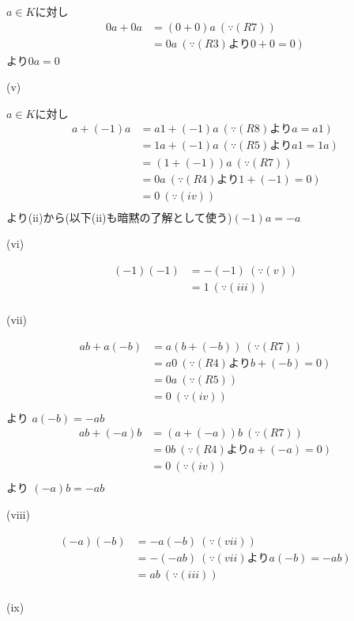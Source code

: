 \documentclass{jsarticle}
\begin{document}
$a\in K$に対し
\begin{align*}
0a+0a &=(0+0)a \ (\because (R7)) \\
&= 0a \ (\because (R3)より0+0=0)
\end{align*}
より$0a=0$

(v)

$a\in K$に対し
\begin{align*}
a+(-1)a &= a1+(-1)a \ (\because (R8)よりa=a1)\\
&= 1a+(-1)a \ (\because (R5)よりa1=1a)\\
&= (1+(-1))a \ (\because (R7))\\
&= 0a \ (\because (R4)より1+(-1)=0)\\
&= 0 \ (\because (iv))\\
\end{align*}
より(ii)から(以下(ii)も暗黙の了解として使う)$(-1)a=-a$


(vi)

\begin{align*}
(-1)(-1) &= -(-1) \ (\because (v))\\
&= 1 \ (\because (iii))\\
\end{align*}

(vii)

\begin{align*}
ab+a(-b) &= a(b+(-b)) \ (\because (R7))\\
&= a0 \ (\because (R4)よりb+(-b)=0)\\
&= 0a \ (\because (R5))\\
&= 0 \ (\because (iv))\\
\end{align*}
より
$a(-b) = -ab$
\begin{align*}
ab+(-a)b &= (a+(-a))b \ (\because (R7))\\
&= 0b \ (\because (R4)よりa+(-a)=0)\\
&= 0 \ (\because (iv))\\
\end{align*}
より
$(-a)b = -ab$

(viii)

\begin{align*}
(-a)(-b) &= -a(-b) \ (\because (vii))\\
&= -(-ab) \ (\because (vii)よりa(-b)=-ab)\\
&= ab \ (\because (iii))\\
\end{align*}

(ix)
\end{document}
